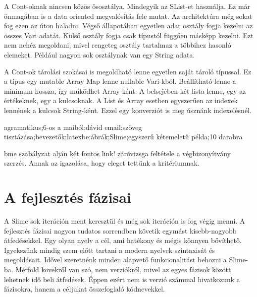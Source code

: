 {A Cont-oknak nincsen közös ősosztálya.
Mindegyik az SList-et használja.
Ez már önmagában is a data oriented megvalósítás fele mutat.
Az architektúra még sokat fog ezen az úton haladni.
Végső állapotában egyetlen adat osztály fogja kezelni az összes Vari adatát. 
Külső osztály fogja csak típustól függően másképp kezelni.
Ezt nem nehéz megoldani, mivel rengeteg osztály tartalmaz a többihez hasonló elemeket.
Például nagyon sok osztálynak van egy String adata.

A Cont-ok tárolási szokásai is megoldható lenne egyetlen saját tároló típussal.
Ez a típus egy mutable Array Map lenne nullable Vari-kból.
Beállítható lenne a minimum hossza, így működhet Array-ként.
A belsejében két lista lenne, egy az értékeknek, egy a kulcsoknak.
A List és Array esetben egyszerűen az indexek lennének a kulcsok String-ként.
Ezzel egy konverziót is meg úsznánk indexelésnél.

agramatikus;6-os a maiból;dávid email;szöveg tisztázása;bevezetők;latexbe;ábrák;Slime;egyszerű kétemeletű példa;10 darabra

bme szabályzat alján két fontos link!
záróvizsga feltétele a végbizonyítvány szerzés.
Annak az igazolása, hogy eleget tettünk a kritériumnak.




\section{A fejlesztés fázisai}
A Slime sok iteráción ment keresztül és még sok iteráción is fog végig menni. 
A fejlesztés fázisai nagyon tudatos sorrendben követik egymást kisebb-nagyobb átfedésekkel.
Egy olyan nyelv a cél, ami hatékony és mégis könnyen bővíthető.
Igyekszünk mindig szem előtt tartani a modern nyelvek szintaxisát és megoldásait.
Idővel szeretnénk minden alapvető funkcionalitást behozni a Slime-ba.
Mérföld kövekről van szó, nem verziókról, mivel az egyes fázisok között lehetnek idő beli átfedések.
Éppen ezért nem is verzió számmal hivatkozunk a fázisokra, hanem a céljukat összefoglaló kódnevekkel.

}
